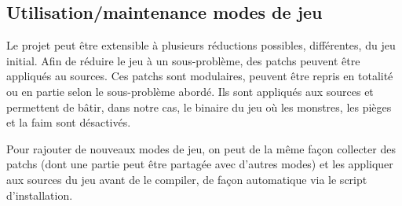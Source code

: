 \subsection{Utilisation/maintenance modes de jeu}

Le projet peut être extensible à plusieurs réductions possibles, différentes, du jeu initial. Afin de réduire le jeu à un sous-problème, des patchs peuvent être appliqués au sources. Ces patchs sont modulaires, peuvent être repris en totalité ou en partie selon le sous-problème abordé. Ils sont appliqués aux sources et permettent de bâtir, dans notre cas, le binaire du jeu où les monstres, les pièges et la faim sont désactivés.

Pour rajouter de nouveaux modes de jeu, on peut de la même façon collecter des patchs (dont une partie peut être partagée avec d'autres modes) et les appliquer aux sources du jeu avant de le compiler, de façon automatique via le script d'installation.
